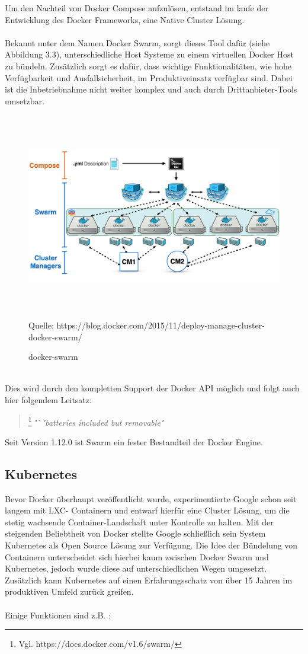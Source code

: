 \documentclass[12pt,toc=bib,toc=listof]{scrreprt}
\begin{document}
Um den Nachteil von Docker Compose aufzulösen, entstand im laufe der Entwicklung des Docker Frameworks, eine Native Cluster Lösung.\\
\\
Bekannt unter dem Namen Docker Swarm, sorgt dieses Tool dafür (siehe Abbildung 3.3), unterschiedliche Host Systeme zu einem virtuellen Docker Host zu bündeln.
Zusätzlich sorgt es dafür, dass wichtige Funktionalitäten, wie hohe Verfügbarkeit und Ausfallsicherheit, im Produktiveinsatz verfügbar sind.
Dabei ist die Inbetriebnahme nicht weiter komplex und auch durch Drittanbieter-Tools umsetzbar.\\
\begin{figure}
	\centering
	\caption{docker-swarm}
	\includegraphics[width=15cm, height=9cm, scale=0.3]{docker-swarm.png}
	Quelle: https://blog.docker.com/2015/11/deploy-manage-cluster-docker-swarm/
\end{figure}
\\
Dies wird durch den kompletten Support der Docker API möglich und folgt auch hier folgendem Leitsatz:

\begin{quote}
	\footnote[1]{Vgl. https://docs.docker.com/v1.6/swarm/}
	"`\textit{"batteries included but removable"}
\end{quote}
Seit Version 1.12.0 ist Swarm ein fester Bestandteil der Docker Engine.\cite{swarm}
\subsection{Kubernetes}
Bevor Docker überhaupt veröffentlicht wurde, experimentierte Google schon seit langem mit LXC- Containern und entwarf hierfür eine Cluster Lösung, um die stetig wachsende Container-Landschaft unter Kontrolle zu halten.
Mit der steigenden Beliebtheit von Docker stellte Google schließlich sein System Kubernetes als Open Source Lösung zur Verfügung.
Die Idee der Bündelung von Containern unterscheidet sich hierbei kaum zwischen Docker Swarm und Kubernetes, jedoch wurde diese auf unterschiedlichen Wegen umgesetzt.
Zusätzlich kann Kubernetes auf einen Erfahrungsschatz von über 15 Jahren im produktiven Umfeld zurück greifen.\\
\\
Einige Funktionen sind z.B. :
\end{document}
